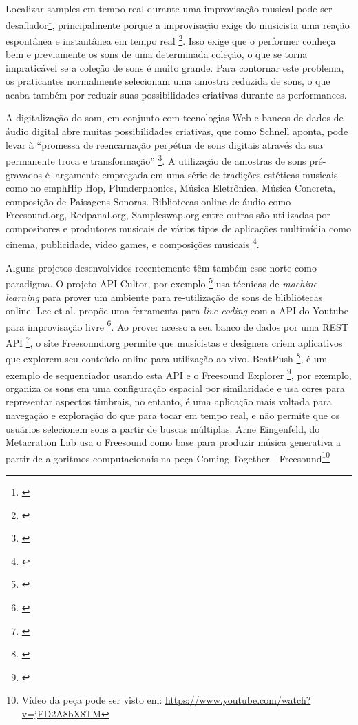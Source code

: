 Localizar samples em tempo real durante uma improvisação musical pode ser desafiador\footnote{\cite{Xambo2018}}, principalmente porque a improvisação exige do musicista uma reação espontânea e instantânea em tempo real \footnote{\cite{canonne2011model}}. Isso exige que o performer conheça bem e previamente os sons de uma determinada coleção, o que se torna impraticável se a coleção de sons é muito grande. Para contornar este problema, os praticantes normalmente selecionam uma amostra reduzida de sons, o que acaba também por reduzir suas possibilidades criativas durante as performances.

A digitalização do som, em conjunto com tecnologias Web e bancos de dados de áudio digital abre muitas possibilidades criativas, que como Schnell aponta, pode levar à ``promessa de reencarnação perpétua de sons digitais através da sua permanente troca e transformação'' \footnote{\cite{Schnell2013}}. A utilização de amostras de sons pré-gravados é largamente empregada em uma série de tradições estéticas musicais como no emph{Hip Hop, Plunderphonics, Música Eletrônica, Música Concreta, composição de Paisagens Sonoras}. Bibliotecas online de áudio como Freesound.org, Redpanal.org, Sampleswap.org entre outras são utilizadas por compositores e produtores musicais de vários tipos de aplicações multimídia como cinema, publicidade, video games, e composições musicais \footnote{\cite{Roma2013}}. 

Alguns projetos desenvolvidos recentemente têm também esse norte como paradigma. O projeto API Cultor, por exemplo \footnote{\cite{Ordiales2017}} usa técnicas de \emph{machine learning} para prover um ambiente para re-utilização de sons de blibliotecas online. Lee et al. propõe uma ferramenta para \emph{live coding} com a API do Youtube para improvisação livre \footnote{\cite{Lee}}. Ao prover acesso a seu banco de dados por uma REST API \footnote{\cite{Akkermans2011}}, o site Freesound.org permite que musicistas e designers criem aplicativos que explorem seu conteúdo online para utilização ao vivo. BeatPush \footnote{\cite{Feenstra2016}}, é um exemplo de sequenciador usando esta API e o Freesound Explorer \footnote{\cite{Font2016}}, por exemplo, organiza os sons em uma configuração espacial por similaridade e usa cores para representar aspectos timbrais, no entanto, é uma aplicação mais voltada para navegação e exploração do que para tocar em tempo real, e não permite que os usuários selecionem sons a partir de buscas múltiplas. 
Arne Eingenfeld, do Metacration Lab usa o Freesound como base para produzir música generativa a partir de algoritmos computacionais na peça Coming Together - Freesound\footnote{Vídeo da peça pode ser visto em: \url{https://www.youtube.com/watch?v=jFD2A8bX8TM}}

